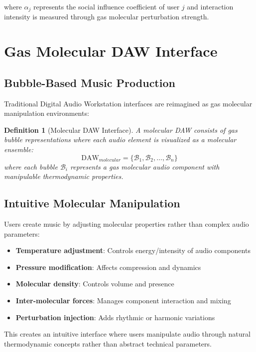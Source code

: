 \documentclass[12pt,a4paper]{article}
\newtheorem{definition}[theorem]{Definition}
\begin{document}
where $\alpha_j$ represents the social influence coefficient of user $j$ and interaction intensity is measured through gas molecular perturbation strength.


\section{Gas Molecular DAW Interface}

\subsection{Bubble-Based Music Production}

Traditional Digital Audio Workstation interfaces are reimagined as gas molecular manipulation environments:

\begin{definition}[Molecular DAW Interface]
A molecular DAW consists of gas bubble representations where each audio element is visualized as a molecular ensemble:
\begin{equation}
\text{DAW}_{molecular} = \{\mathcal{B}_1, \mathcal{B}_2, \ldots, \mathcal{B}_n\}
\end{equation}
where each bubble $\mathcal{B}_i$ represents a gas molecular audio component with manipulable thermodynamic properties.
\end{definition}

\subsection{Intuitive Molecular Manipulation}

Users create music by adjusting molecular properties rather than complex audio parameters:

\begin{itemize}
\item \textbf{Temperature adjustment}: Controls energy/intensity of audio components
\item \textbf{Pressure modification}: Affects compression and dynamics
\item \textbf{Molecular density}: Controls volume and presence
\item \textbf{Inter-molecular forces}: Manages component interaction and mixing
\item \textbf{Perturbation injection}: Adds rhythmic or harmonic variations
\end{itemize}

This creates an intuitive interface where users manipulate audio through natural thermodynamic concepts rather than abstract technical parameters.
\end{document}
